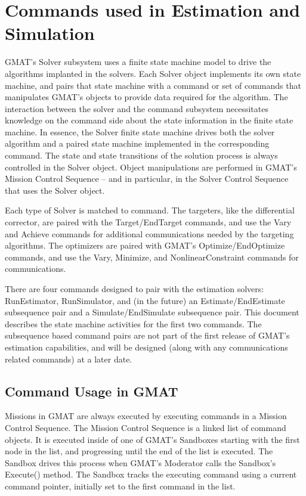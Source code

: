 \chapter{Commands used in Estimation and Simulation}


GMAT's Solver subsystem uses a finite state machine model to drive the algorithms implanted in the solvers.  Each Solver object implements its own state machine, and pairs that state machine with a command or set of commands that manipulates GMAT's objects to provide data required for the algorithm.  The interaction between the solver and the command subsystem necessitates knowledge on the command side about the state information in the finite state machine.  In essence, the Solver finite state machine drives both the solver algorithm and a paired state machine implemented in the corresponding command.  The state and state transitions of the solution process is always controlled in the Solver object.  Object manipulations are performed in GMAT's Mission Control Sequence -- and in particular, in the Solver Control Sequence that uses the Solver object.

Each type of Solver is matched to command.  The targeters, like the differential corrector, are paired with the Target/EndTarget commands, and use the Vary and Achieve commands for additional communications needed by the targeting algorithms.  The optimizers are paired with GMAT's Optimize/EndOptimize commands, and use the Vary, Minimize, and NonlinearConstraint commands for communications.

There are four commands designed to pair with the estimation solvers: RunEstimator, RunSimulator, and (in the future) an Estimate/EndEstimate subsequence pair and a Simulate/EndSimulate subsequence pair.  This document describes the state machine activities for the first two commands. The subsequence based command pairs are not part of the first release of GMAT's estimation capabilities, and will be designed (along with any communications related commands) at a later date.

\section{Command Usage in GMAT}

Missions in GMAT are always executed by executing commands in a Mission Control Sequence.  The Mission Control Sequence is a linked list of command objects.  It is executed inside of one of GMAT's Sandboxes starting with the first node in the list, and progressing until the end of the list is executed.  The Sandbox drives this process when GMAT's Moderator calls the Sandbox's Execute() method.  The Sandbox tracks the executing command using a current command pointer, initially set to the first command in the list.

